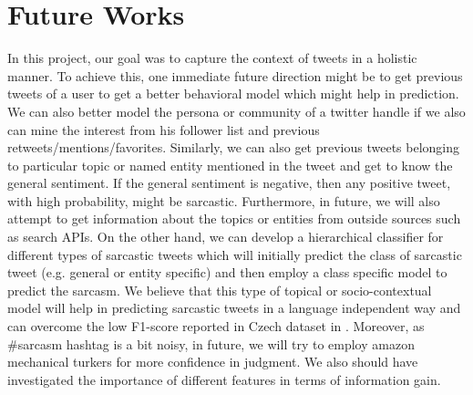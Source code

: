 \section{Future Works}
\label{sec:future}
In this project, our goal was to capture the context of tweets in a holistic manner. To achieve this, one immediate future direction might be to get previous tweets of a user to get a better behavioral model which might help in prediction. We can also better model the persona or community of a twitter handle if we also can mine the interest from his follower list and previous retweets/mentions/favorites. Similarly, we can also get previous tweets belonging to particular topic or named entity mentioned in the tweet and get to know the general sentiment. If the general sentiment is negative, then any positive tweet, with high probability, might be sarcastic. Furthermore, in future, we will also attempt to get information about the topics or entities from outside sources such as search APIs. On the other hand, we can develop a hierarchical classifier for different types of sarcastic tweets which will initially predict the class of sarcastic tweet (e.g. general or entity specific) and then employ a class specific model to predict the sarcasm. We believe that this type of topical or socio-contextual model will help in predicting sarcastic tweets in a language independent way and can overcome the low F1-score reported in Czech dataset in \cite{tomas14}. Moreover, as \#sarcasm hashtag is a bit noisy, in future, we will try to employ amazon mechanical turkers for more confidence in judgment. We also should have investigated the importance of different features in terms of information gain.